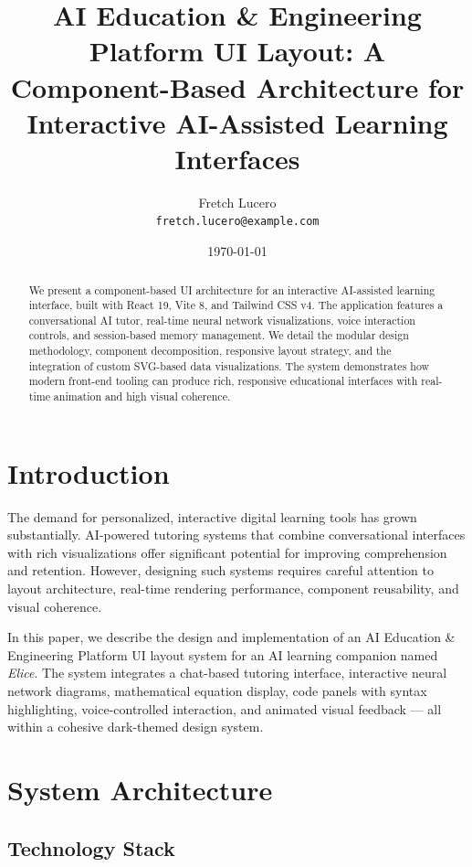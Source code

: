 \documentclass[11pt,a4paper]{article}
\title{AI Education \& Engineering Platform UI Layout: A Component-Based Architecture for\\Interactive AI-Assisted Learning Interfaces}
\author{
  Fretch Lucero\\
  \texttt{fretch.lucero@example.com}
}
\date{\today}
\begin{document}
\maketitle

\begin{abstract}
We present a component-based UI architecture for an interactive AI-assisted learning interface, built with React 19, Vite 8, and Tailwind CSS v4. The application features a conversational AI tutor, real-time neural network visualizations, voice interaction controls, and session-based memory management. We detail the modular design methodology, component decomposition, responsive layout strategy, and the integration of custom SVG-based data visualizations. The system demonstrates how modern front-end tooling can produce rich, responsive educational interfaces with real-time animation and high visual coherence.
\end{abstract}

\section{Introduction}

The demand for personalized, interactive digital learning tools has grown substantially. AI-powered tutoring systems that combine conversational interfaces with rich visualizations offer significant potential for improving comprehension and retention. However, designing such systems requires careful attention to layout architecture, real-time rendering performance, component reusability, and visual coherence.

In this paper, we describe the design and implementation of an AI Education \& Engineering Platform UI layout system for an AI learning companion named {\itshape Elice}. The system integrates a chat-based tutoring interface, interactive neural network diagrams, mathematical equation display, code panels with syntax highlighting, voice-controlled interaction, and animated visual feedback --- all within a cohesive dark-themed design system.

\section{System Architecture}

\subsection{Technology Stack}
\end{document}
